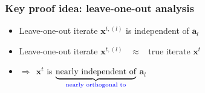 \documentclass[compress,
mathserif,wide,%
]{beamer}
\begin{document}
\begin{frame}
	\frametitle{Key proof idea: leave-one-out analysis}

\begin{figure}
\centering
\end{figure}
\begin{itemize}
	\itemsep0.5em
	\item Leave-one-out iterate $\bm{x}^{t,(l)}$ is independent of $\bm{a}_l$
	\item<2-> Leave-one-out iterate $\bm{x}^{t,(l)}$ ~$\approx$~ true iterate $\bm{x}^{t}$ 
	\item<3->[] \qquad\qquad $\Longrightarrow~~\bm{x}^{t}$ is $\underset{\textcolor{blue}{ \text{nearly orthogonal to}}}{\underbrace{\text{nearly independent of}}}$  $\bm{a}_{l}$
\end{itemize}
\end{frame}




\begin{comment}

\begin{frame}
	\frametitle{Incoherence region in high dimensions}

\begin{center}
\begin{tabular}{cc}
 \texttt{[image: \\yuxinRegFigs/GD\_converge\_2D.pdf]}& \texttt{[image: \\yuxinRegFigs/GD\_converge\_highD.pdf]}\tabularnewline
 2-dimensional & $\underset{\alertb{\text{incoherence region is vanishingly small}}}{\underbrace{\text{high-dimensional (mental representation)}}}$ \tabularnewline
\end{tabular}
%
\end{center}
\end{frame}

\end{comment}
\end{document}

